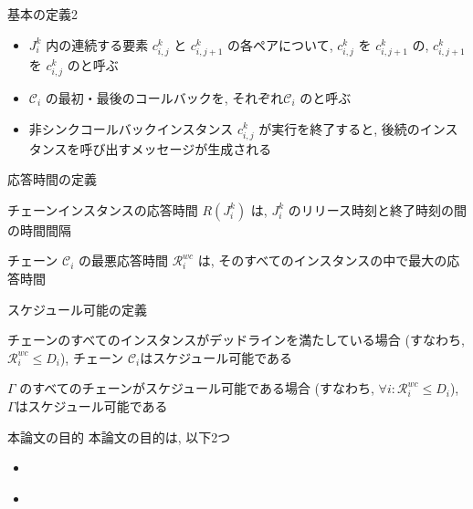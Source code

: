 \begin{frame}{基本の定義2}
    \begin{itemize}
        \item $J_{i}^{k}$ 内の連続する要素 $c_{i, j}^{k}$ と $c_{i, j+1}^{k}$ の各ペアについて, $c_{i, j}^{k}$ を $c_{i, j+1}^{k}$ の, $c_{i, j+1}^{k}$ を $c_{i, j}^{k}$ のと呼ぶ
        \item $\mathcal{C}_{i}$ の最初・最後のコールバックを, それぞれ$\mathcal{C}_{i}$ のと呼ぶ
        \item 非シンクコールバックインスタンス $c_{i, j}^{k}$ が実行を終了すると, 後続のインスタンスを呼び出すメッセージが生成される
    \end{itemize}
\end{frame}

\begin{frame}{応答時間の定義}
    \begin{definition}
        チェーンインスタンスの応答時間 $R\left(J_{i}^{k}\right)$ は,  $J_{i}^{k}$ のリリース時刻と終了時刻の間の時間間隔
    \end{definition}
    \begin{definition}
        チェーン $\mathcal{C}_{i}$ の最悪応答時間 $\mathcal{R}_{i}^{w c}$ は, そのすべてのインスタンスの中で最大の応答時間
    \end{definition}
\end{frame}

\begin{frame}{スケジュール可能の定義}
    \begin{definition}
        チェーンのすべてのインスタンスがデッドラインを満たしている場合 (すなわち, $\mathcal{R}_{i}^{w c} \leq D_{i}$), チェーン $\mathcal{C}_{i}$はスケジュール可能である
    \end{definition}
    \begin{definition}
        $\Gamma$ のすべてのチェーンがスケジュール可能である場合 (すなわち, $\forall i: \mathcal{R}_{i}^{w c} \leq D_{i}$), $\Gamma$はスケジュール可能である
    \end{definition}
\end{frame}

\begin{frame}{本論文の目的}
    本論文の目的は, 以下2つ
    \begin{itemize}
        \item {}
        \item {} \\
    \end{itemize}
\end{frame}


